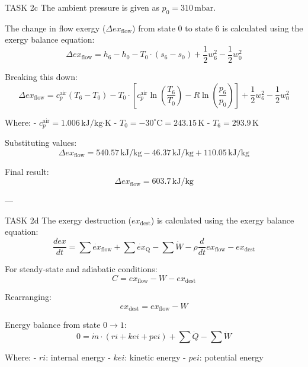 TASK 2c  
The ambient pressure is given as \( p_0 = 310 \, \text{mbar} \).  

The change in flow exergy (\( \Delta ex_{\text{flow}} \)) from state 0 to state 6 is calculated using the exergy balance equation:  
\[
\Delta ex_{\text{flow}} = h_6 - h_0 - T_0 \cdot (s_6 - s_0) + \frac{1}{2} w_6^2 - \frac{1}{2} w_0^2
\]  

Breaking this down:  
\[
\Delta ex_{\text{flow}} = c_p^{\text{air}} (T_6 - T_0) - T_0 \cdot \left[ c_p^{\text{air}} \ln\left(\frac{T_6}{T_0}\right) - R \ln\left(\frac{p_6}{p_0}\right) \right] + \frac{1}{2} w_6^2 - \frac{1}{2} w_0^2
\]  

Where:  
- \( c_p^{\text{air}} = 1.006 \, \text{kJ/kg·K} \)  
- \( T_0 = -30^\circ\text{C} = 243.15 \, \text{K} \)  
- \( T_6 = 293.9 \, \text{K} \)  

Substituting values:  
\[
\Delta ex_{\text{flow}} = 540.57 \, \text{kJ/kg} - 46.37 \, \text{kJ/kg} + 110.05 \, \text{kJ/kg}
\]  

Final result:  
\[
\Delta ex_{\text{flow}} = 603.7 \, \text{kJ/kg}
\]  

---

TASK 2d  
The exergy destruction (\( ex_{\text{dest}} \)) is calculated using the exergy balance equation:  
\[
\frac{d ex}{dt} = \sum \dot{ex}_{\text{flow}} + \sum \dot{ex}_{\text{Q}} - \sum \dot{W} - \rho \frac{d}{dt} ex_{\text{flow}} - ex_{\text{dest}}
\]  

For steady-state and adiabatic conditions:  
\[
C = ex_{\text{flow}} - W - ex_{\text{dest}}
\]  

Rearranging:  
\[
ex_{\text{dest}} = ex_{\text{flow}} - W
\]  

Energy balance from state \( 0 \to 1 \):  
\[
0 = \dot{m} \cdot (ri + kei + pei) + \sum \dot{Q} - \sum \dot{W}
\]  

Where:  
- \( ri \): internal energy  
- \( kei \): kinetic energy  
- \( pei \): potential energy  

